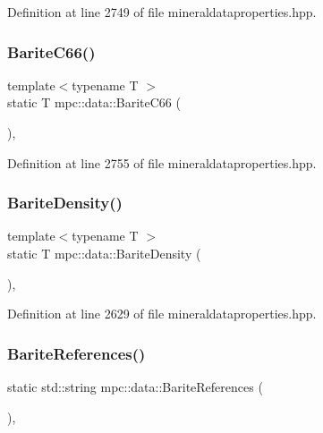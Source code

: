 Definition at line 2749 of file mineraldataproperties.\+hpp.

\mbox{\label{namespacempc_1_1data_afd358dfd99022852d6d70322c9348afd}} 
\subsubsection{\texorpdfstring{Barite\+C66()}{BariteC66()}}
{\footnotesize\ttfamily template$<$typename T $>$ \\
static T mpc\+::data\+::\+Barite\+C66 (\begin{DoxyParamCaption}{ }\end{DoxyParamCaption})\hspace{0.3cm}{\ttfamily [inline]}, {\ttfamily [static]}}



Definition at line 2755 of file mineraldataproperties.\+hpp.

\mbox{\label{namespacempc_1_1data_ae5d92870bf347bdc2f05d7c81ea23adb}} 
\subsubsection{\texorpdfstring{Barite\+Density()}{BariteDensity()}}
{\footnotesize\ttfamily template$<$typename T $>$ \\
static T mpc\+::data\+::\+Barite\+Density (\begin{DoxyParamCaption}{ }\end{DoxyParamCaption})\hspace{0.3cm}{\ttfamily [inline]}, {\ttfamily [static]}}



Definition at line 2629 of file mineraldataproperties.\+hpp.

\mbox{\label{namespacempc_1_1data_aeddefaf0026586312d9986804d253a69}} 
\subsubsection{\texorpdfstring{Barite\+References()}{BariteReferences()}}
{\footnotesize\ttfamily static std\+::string mpc\+::data\+::\+Barite\+References (\begin{DoxyParamCaption}{ }\end{DoxyParamCaption})\hspace{0.3cm}{\ttfamily [inline]}, {\ttfamily [static]}}



